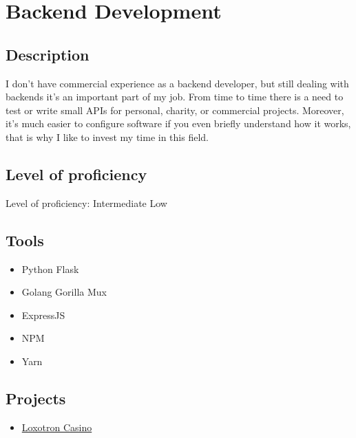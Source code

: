 \section{Backend Development}

\subsection{Description}

I don't have commercial experience as a backend developer,
but still dealing with backends it's an important part of my job.
From time to time there is a need to test or write small APIs for personal,
charity, or commercial projects. Moreover, it's much easier to configure software
if you even briefly understand how it works, that is why I like to invest my time in this field.

\subsection{Level of proficiency}

Level of proficiency: Intermediate Low

\subsection{Tools}
\begin{itemize}
    \item Python Flask
    \item Golang Gorilla Mux
    \item ExpressJS
    \item NPM
    \item Yarn
\end{itemize}

\subsection{Projects}

\begin{itemize}
    \item \hyperlink{proj_loxotron}{Loxotron Casino}
\end{itemize}

\newpage
